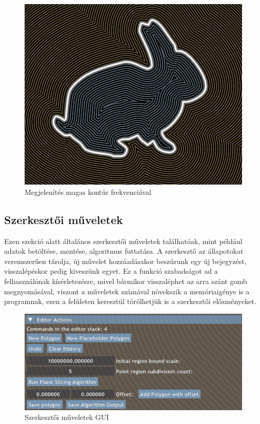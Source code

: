 \begin{figure}[H]
    \centering
    \includegraphics[width=0.85\linewidth]{images/high_contour_frequency.png}
    \caption{Megjelenítés magas kontúr frekvenciával}
    \label{fig:high_contour_frequency-1}
\end{figure}

\subsection{Szerkesztői műveletek}

Ezen szekció alatt általános szerkesztői műveletek találhatóak, mint például adatok betöltése, mentése, algoritmus futtatása. A szerkesztő az állapotokat veremszerűen tárolja, új művelet hozzáadásakor beszúrunk egy új bejegyzést, visszalépéskor pedig kiveszünk egyet. Ez a funkció szabadságot ad a felhasználónak kísérletezésre, mivel bármikor visszaléphet az arra szánt gomb megnyomásával, viszont a műveletek számával növekszik a memóriaigénye is a programnak, ezen a felületen keresztül törölhetjük is a szerkesztői előzményeket.

\begin{figure}[H]
    \centering
    \includegraphics[width=0.85\linewidth]{images/editor_actions.png}
    \caption{Szerkesztői műveletek GUI}
    \label{fig:editor_actions-1}
\end{figure}

